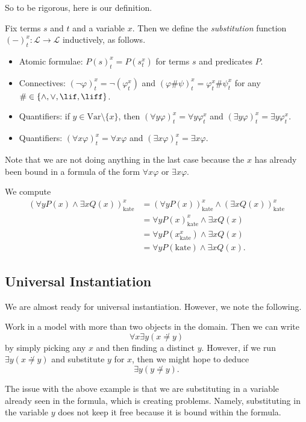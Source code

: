So to be rigorous, here is our definition.
\begin{definition}
	Fix terms $s$ and $t$ and a variable $x$. Then we define the \textit{substitution} function $(-)^x_t:\mathcal L\to\mathcal L$ inductively, as follows.
	\begin{itemize}
		\item Atomic formulae: $P(s)^x_t=P\left(s^x_t\right)$ for terms $s$ and predicates $P$.
		\item Connectives: $(\lnot\varphi)^x_t=\lnot(\varphi^x_t)$ and $(\varphi\#\psi)^x_t=\varphi^x_t\#\psi^x_t$ for any $\#\in\{\land,\lor,\lif,\liff\}$.
		\item Quantifiers: if $y\in\mathrm{Var}\setminus\{x\}$, then $(\forall y\varphi)_t^x=\forall y\varphi^x_t$ and $(\exists y\varphi)_t^x=\exists y\varphi^x_t$.
		\item Quantifiers: $(\forall x\varphi)_t^x=\forall x\varphi$ and $(\exists x\varphi)_t^x=\exists x\varphi$.
	\end{itemize}
\end{definition}
Note that we are not doing anything in the last case because the $x$ has already been bound in a formula of the form $\forall x\varphi$ or $\exists x\varphi$.
\begin{example}
	We compute
	\begin{align*}
		(\forall yP(x)\land\exists xQ(x))^x_{\mathrm{kate}} &= (\forall yP(x))^x_{\mathrm{kate}}\land(\exists xQ(x))^x_{\mathrm{kate}} \\
		&= \forall yP(x)^x_{\mathrm{kate}}\land\exists xQ(x) \\
		&= \forall yP(x^x_{\mathrm{kate}})\land\exists xQ(x) \\
		&= \forall yP(\mathrm{kate})\land\exists xQ(x).
	\end{align*}
\end{example}

\subsection{Universal Instantiation}
We are almost ready for universal instantiation. However, we note the following.
\begin{example}
	Work in a model with more than two objects in the domain. Then we can write
	\[\forall x\exists y(x\not\doteq y)\]
	by simply picking any $x$ and then finding a distinct $y$. However, if we run $\exists y(x\not\doteq y)$ and substitute $y$ for $x$, then we might hope to deduce
	\[\exists y(y\not\doteq y).\]
\end{example}
The issue with the above example is that we are substituting in a variable already seen in the formula, which is creating problems. Namely, substituting in the variable $y$ does not keep it free because it is bound within the formula.

